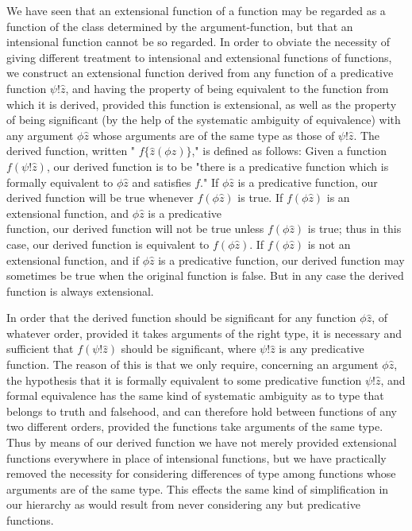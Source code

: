 \documentclass[10pt]{article}
\begin{document}
We have seen that an extensional function of a function may be regarded as a function of the class determined by the argument-function, but that an intensional function cannot be so regarded. In order to obviate the necessity of giving different treatment to intensional and extensional functions of functions, we construct an extensional function derived from any function of a predicative function $\psi!\hat{z}$, and having the property of being equivalent to the function from which it is derived, provided this function is extensional, as well as the property of being significant (by the help of the systematic ambiguity of equivalence) with any argument $\phi \hat{z}$ whose arguments are of the same type as those of $\psi!\hat{z}$. The derived function, written " $f\{\hat{z}(\phi z)\}$," is defined as follows: Given a function $f(\psi!\hat{z})$, our derived function is to be "there is a predicative function which is formally equivalent to $\phi \hat{z}$ and satisfies $f$." If $\phi \hat{z}$ is a predicative function, our derived function will be true whenever $f(\phi \hat{z})$ is true. If $f(\phi \hat{z})$ is an extensional function, and $\phi \hat{z}$ is a predicative\\
function, our derived function will not be true unless $f(\phi \hat{z})$ is true; thus in this case, our derived function is equivalent to $f(\phi \hat{z})$. If $f(\phi \hat{z})$ is not an extensional function, and if $\phi \hat{z}$ is a predicative function, our derived function may sometimes be true when the original function is false. But in any case the derived function is always extensional.

In order that the derived function should be significant for any function $\phi \hat{z}$, of whatever order, provided it takes arguments of the right type, it is necessary and sufficient that $f(\psi!\hat{z})$ should be significant, where $\psi!\hat{z}$ is any predicative function. The reason of this is that we only require, concerning an argument $\phi \hat{z}$, the hypothesis that it is formally equivalent to some predicative function $\psi!\hat{z}$, and formal equivalence has the same kind of systematic ambiguity as to type that belongs to truth and falsehood, and can therefore hold between functions of any two different orders, provided the functions take arguments of the same type. Thus by means of our derived function we have not merely provided extensional functions everywhere in place of intensional functions, but we have practically removed the necessity for considering differences of type among functions whose arguments are of the same type. This effects the same kind of simplification in our hierarchy as would result from never considering any but predicative functions.
\end{document}
